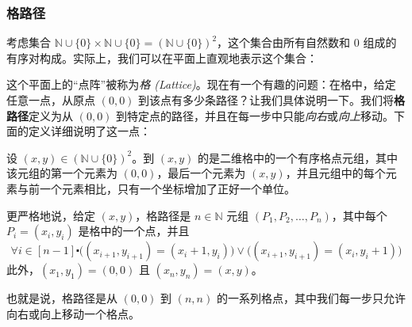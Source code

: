 \subsubsection*{格路径}

考虑集合 $\mathbb{N} \cup \{0\} \times \mathbb{N} \cup \{0\} = (\mathbb{N} \cup \{0\})^2$，这个集合由所有自然数和 $0$ 组成的有序对构成。实际上，我们可以在平面上直观地表示这个集合：
\begin{center}
\end{center}
这个平面上的``点阵''被称为\emph{格 (Lattice)}。现在有一个有趣的问题：在格中，给定任意一点，从原点 $(0, 0)$ 到该点有多少条路径？让我们具体说明一下。我们将\textbf{格路径}定义为从 $(0, 0)$ 到特定点的路径，并且在每一步中只能\emph{向右}或\emph{向上}移动。下面的定义详细说明了这一点：

\begin{definition}
    设 $(x,y) \in (\mathbb{N} \cup \{0\})^2$。到 $(x, y)$ 的是二维格中的一个有序格点元组，其中该元组的第一个元素为 $(0, 0)$，最后一个元素为 $(x, y)$，并且元组中的每个元素与前一个元素相比，只有一个坐标增加了正好一个单位。

    更严格地说，给定 $(x, y)$，格路径是 $n \in \mathbb{N}$ 元组 $(P_1, P_2, \dots, P_n)$，其中每个 $P_i = (x_i, y_i)$ 是格中的一个点，并且
    \[\forall i \in [n - 1] \centerdot \big((x_{i+1}, y_{i+1}) = (x_i + 1, y_i)\big) \lor \big((x_{i+1}, y_{i+1}) = (x_i, y_i + 1)\big)\]
    此外，$(x_1, y_1) = (0, 0)$ 且 $(x_n, y_n) = (x, y)$。

    也就是说，格路径是从 $(0, 0)$ 到 $(n, n)$ 的一系列格点，其中我们每一步只允许向右或向上移动一个格点。
\end{definition}

